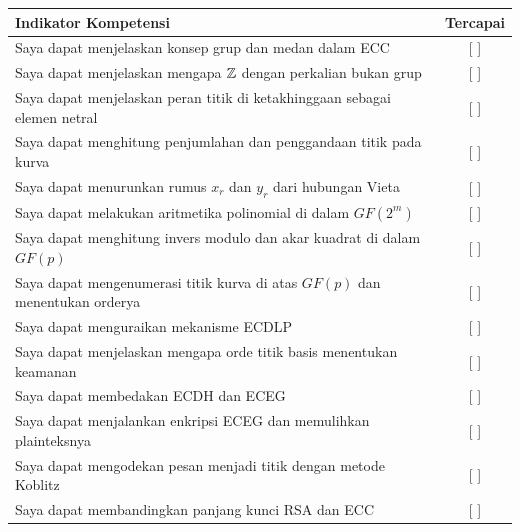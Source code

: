 \begin{competencychecklist}
\begin{tabularx}{\linewidth}{|X|c|}
\hline
Indikator Kompetensi & Tercapai \\
\hline
Saya dapat menjelaskan konsep grup dan medan dalam ECC & [ ] \\
\hline
Saya dapat menjelaskan mengapa $\mathbb{Z}$ dengan perkalian bukan grup & [ ] \\
\hline
Saya dapat menjelaskan peran titik di ketakhinggaan sebagai elemen netral & [ ] \\
\hline
Saya dapat menghitung penjumlahan dan penggandaan titik pada kurva & [ ] \\
\hline
Saya dapat menurunkan rumus $x_r$ dan $y_r$ dari hubungan Vieta & [ ] \\
\hline
Saya dapat melakukan aritmetika polinomial di dalam $GF(2^m)$ & [ ] \\
\hline
Saya dapat menghitung invers modulo dan akar kuadrat di dalam $GF(p)$ & [ ] \\
\hline
Saya dapat mengenumerasi titik kurva di atas $GF(p)$ dan menentukan orderya & [ ] \\
\hline
Saya dapat menguraikan mekanisme ECDLP & [ ] \\
\hline
Saya dapat menjelaskan mengapa orde titik basis menentukan keamanan & [ ] \\
\hline
Saya dapat membedakan ECDH dan ECEG & [ ] \\
\hline
Saya dapat menjalankan enkripsi ECEG dan memulihkan plainteksnya & [ ] \\
\hline
Saya dapat mengodekan pesan menjadi titik dengan metode Koblitz & [ ] \\
\hline
Saya dapat membandingkan panjang kunci RSA dan ECC & [ ] \\
\hline
\end{tabularx}
\end{competencychecklist}
